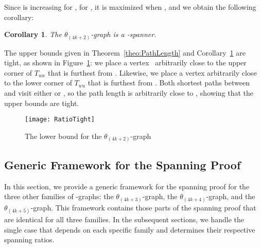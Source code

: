 \documentclass[12pt]{article}
\newtheorem{coro}[defin]{Corollary}
\newcommand{\graph}[1]{\ensuremath{\theta_{(4 k + #1)}}-graph\xspace}
\newcommand{\canon}[2]{\ensuremath{T_{#1 #2}}}
\begin{document}
Since  is increasing for , for , it is maximized when , and we obtain the following corollary: 

\begin{coro}
  \label{cor:SpanningRatio}
  The \graph{2} is a -spanner. 
\end{coro}

The upper bounds given in Theorem~\ref{theo:PathLength} and Corollary~\ref{cor:SpanningRatio} are tight, as shown in Figure~\ref{fig:RatioTight}: we place a vertex~ arbitrarily close to the upper corner of \canon{u}{w} that is furthest from . Likewise, we place a vertex  arbitrarily close to the lower corner of \canon{w}{u} that is furthest from . Both shortest paths between  and  visit either  or , so the path length is arbitrarily close to , showing that the upper bounds are tight. 

\begin{figure}[ht]
  \begin{center}
    \texttt{[image: RatioTight]}
  \end{center}
  \caption{The lower bound for the \graph{2}}
  \label{fig:RatioTight}
\end{figure}


\subsection{Generic Framework for the Spanning Proof}
In this section, we provide a generic framework for the spanning proof for the three other families of -graphs: the \graph{3}, the \graph{4}, and the \graph{5}. This framework contains those parts of the spanning proof that are identical for all three families. In the subsequent sections, we handle the single case that depends on each specific family and determines their respective spanning ratios. 
\end{document}
